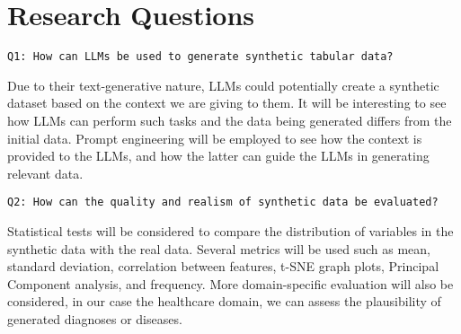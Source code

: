\chapter{Research Questions}



\noindent \texttt{Q1: How can LLMs be used to generate synthetic tabular data?}

Due to their text-generative nature, LLMs could potentially create a synthetic dataset based on the context we are giving to them. It will be interesting to see how LLMs can perform such tasks and the data being generated differs from the initial data.
Prompt engineering will be employed to see how the context is provided to the LLMs, and how the latter can guide the LLMs in generating relevant data.




\vspace{1cm}

\noindent \texttt{Q2: How can the quality and realism of synthetic data be evaluated?}

Statistical tests will be considered to compare the distribution of variables in the synthetic data with the real data. Several metrics will be used such as mean, standard deviation, correlation between features, t-SNE graph plots, Principal Component analysis, and frequency. 
More domain-specific evaluation will also be considered, in our case the healthcare domain, we can assess the plausibility of generated diagnoses or diseases.








